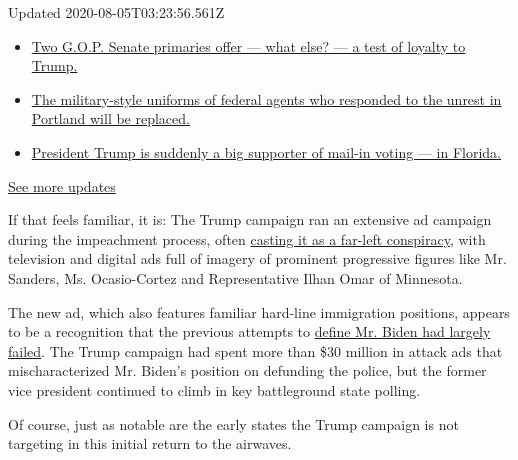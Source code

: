 Updated 2020-08-05T03:23:56.561Z

\begin{itemize}
\tightlist
\item
  \href{https://www.nytimes3xbfgragh.onion/2020/08/04/us/elections/primary-election-michigan-arizona-kansas.html?action=click\&pgtype=Article\&state=default\&region=MAIN_CONTENT_1\&context=storylines_live_updates\#link-3924dd44}{Two
  G.O.P. Senate primaries offer --- what else? --- a test of loyalty to
  Trump.}
\item
  \href{https://www.nytimes3xbfgragh.onion/2020/08/04/us/elections/primary-election-michigan-arizona-kansas.html?action=click\&pgtype=Article\&state=default\&region=MAIN_CONTENT_1\&context=storylines_live_updates\#link-62a8e06b}{The
  military-style uniforms of federal agents who responded to the unrest
  in Portland will be replaced.}
\item
  \href{https://www.nytimes3xbfgragh.onion/2020/08/04/us/elections/primary-election-michigan-arizona-kansas.html?action=click\&pgtype=Article\&state=default\&region=MAIN_CONTENT_1\&context=storylines_live_updates\#link-32b39e33}{President
  Trump is suddenly a big supporter of mail-in voting --- in Florida.}
\end{itemize}

\href{https://www.nytimes3xbfgragh.onion/2020/08/04/us/elections/primary-election-michigan-arizona-kansas.html?action=click\&pgtype=Article\&state=default\&region=MAIN_CONTENT_1\&context=storylines_live_updates}{See
more updates}

If that feels familiar, it is: The Trump campaign ran an extensive ad
campaign during the impeachment process, often
\href{https://www.nytimes3xbfgragh.onion/2019/10/28/us/politics/impeachment-ads-facebook.html}{casting
it as a far-left conspiracy}, with television and digital ads full of
imagery of prominent progressive figures like Mr. Sanders, Ms.
Ocasio-Cortez and Representative Ilhan Omar of Minnesota.

The new ad, which also features familiar hard-line immigration
positions, appears to be a recognition that the previous attempts to
\href{https://www.nytimes3xbfgragh.onion/2020/07/10/us/biden-trump.html}{define
Mr. Biden had largely failed}. The Trump campaign had spent more than
\$30 million in attack ads that mischaracterized Mr. Biden's position on
defunding the police, but the former vice president continued to climb
in key battleground state polling.

Of course, just as notable are the early states the Trump campaign is
not targeting in this initial return to the airwaves.

